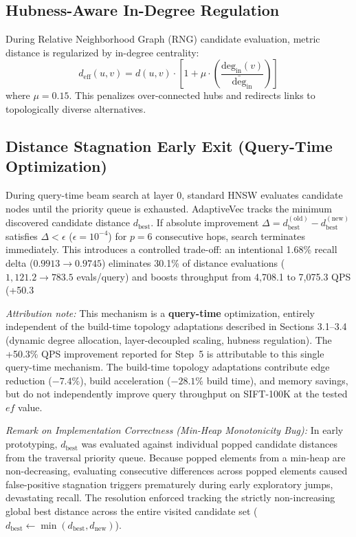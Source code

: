 \documentclass[conference,10pt]{IEEEtran}
\begin{document}
\subsection{Hubness-Aware In-Degree Regulation}
During Relative Neighborhood Graph (RNG) candidate evaluation, metric distance is regularized by in-degree centrality:
\begin{equation}
d_{\text{eff}}(u, v) = d(u, v) \cdot \left[ 1 + \mu \cdot \left( \frac{\text{deg}_{\text{in}}(v)}{\bar{\text{deg}}_{\text{in}}} \right) \right]
\end{equation}
where $\mu = 0.15$. This penalizes over-connected hubs and redirects links to topologically diverse alternatives.

\subsection{Distance Stagnation Early Exit (Query-Time Optimization)}
During query-time beam search at layer 0, standard HNSW evaluates candidate nodes until the priority queue is exhausted. AdaptiveVec tracks the minimum discovered candidate distance $d_{\text{best}}$. If absolute improvement $\Delta = d_{\text{best}}^{(\text{old})} - d_{\text{best}}^{(\text{new})}$ satisfies $\Delta < \epsilon$ ($\epsilon = 10^{-4}$) for $p = 6$ consecutive hops, search terminates immediately. This introduces a controlled trade-off: an intentional 1.68\% recall delta ($0.9913 \to 0.9745$) eliminates 30.1\% of distance evaluations ($1,121.2 \to 783.5$ evals/query) and boosts throughput from 4,708.1 to 7,075.3 QPS (+50.3%

\textit{Attribution note:} This mechanism is a \textbf{query-time} optimization, entirely independent of the build-time topology adaptations described in Sections 3.1--3.4 (dynamic degree allocation, layer-decoupled scaling, hubness regulation). The +50.3\% QPS improvement reported for Step~5 is attributable to this single query-time mechanism. The build-time topology adaptations contribute edge reduction ($-7.4\%$), build acceleration ($-28.1\%$ build time), and memory savings, but do not independently improve query throughput on SIFT-100K at the tested $ef$ value.

\textit{Remark on Implementation Correctness (Min-Heap Monotonicity Bug):} In early prototyping, $d_{\text{best}}$ was evaluated against individual popped candidate distances from the traversal priority queue. Because popped elements from a min-heap are non-decreasing, evaluating consecutive differences across popped elements caused false-positive stagnation triggers prematurely during early exploratory jumps, devastating recall. The resolution enforced tracking the strictly non-increasing global best distance across the entire visited candidate set ($d_{\text{best}} \leftarrow \min(d_{\text{best}}, d_{\text{new}})$).
\end{document}
